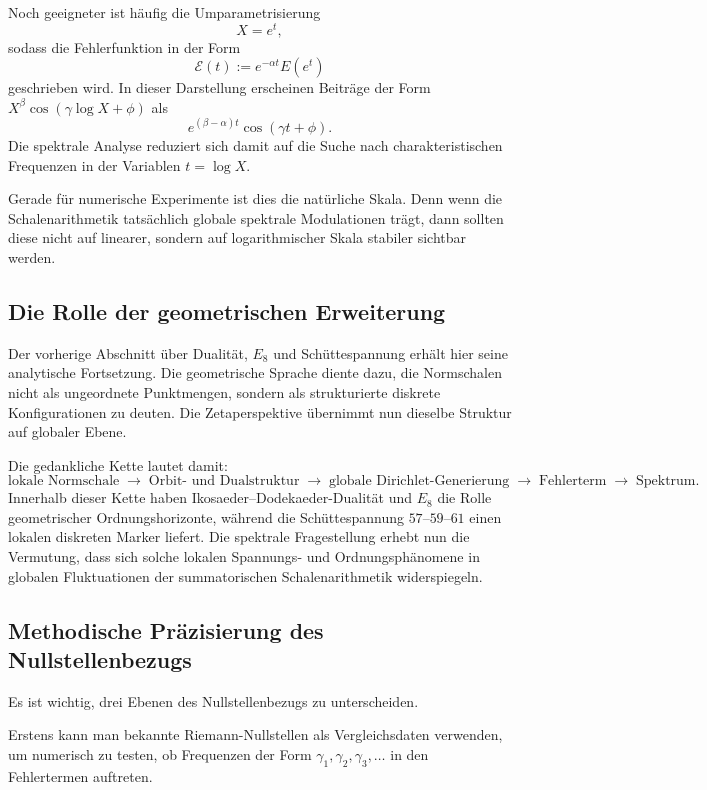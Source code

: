 \documentclass[a4paper,12pt]{article}
\theoremstyle{definition}
\numberwithin{equation}{section}
\begin{document}
	Noch geeigneter ist häufig die Umparametrisierung
	\[
	X = e^t,
	\]
	sodass die Fehlerfunktion in der Form
	\[
	\mathcal E(t) := e^{-\alpha t} E(e^t)
	\]
	geschrieben wird. In dieser Darstellung erscheinen Beiträge der Form $X^\beta \cos(\gamma\log X + \phi)$ als
	\[
	e^{(\beta-\alpha)t} \cos(\gamma t + \phi).
	\]
	Die spektrale Analyse reduziert sich damit auf die Suche nach charakteristischen Frequenzen in der Variablen $t=\log X$.
	
	Gerade für numerische Experimente ist dies die natürliche Skala. Denn wenn die Schalenarithmetik tatsächlich globale spektrale Modulationen trägt, dann sollten diese nicht auf linearer, sondern auf logarithmischer Skala stabiler sichtbar werden.
	
	\subsection{Die Rolle der geometrischen Erweiterung}
	
	Der vorherige Abschnitt über Dualität, $E_8$ und Schüttespannung erhält hier seine analytische Fortsetzung. Die geometrische Sprache diente dazu, die Normschalen nicht als ungeordnete Punktmengen, sondern als strukturierte diskrete Konfigurationen zu deuten. Die Zetaperspektive übernimmt nun dieselbe Struktur auf globaler Ebene.
	
	Die gedankliche Kette lautet damit:
	\[
	\text{lokale Normschale}
	\;\longrightarrow\;
	\text{Orbit- und Dualstruktur}
	\;\longrightarrow\;
	\text{globale Dirichlet-Generierung}
	\;\longrightarrow\;
	\text{Fehlerterm}
	\;\longrightarrow\;
	\text{Spektrum}.
	\]
	Innerhalb dieser Kette haben Ikosaeder--Dodekaeder-Dualität und $E_8$ die Rolle geometrischer Ordnungshorizonte, während die Schüttespannung $57$--$59$--$61$ einen lokalen diskreten Marker liefert. Die spektrale Fragestellung erhebt nun die Vermutung, dass sich solche lokalen Spannungs- und Ordnungsphänomene in globalen Fluktuationen der summatorischen Schalenarithmetik widerspiegeln.
	
	\subsection{Methodische Präzisierung des Nullstellenbezugs}
	
	Es ist wichtig, drei Ebenen des Nullstellenbezugs zu unterscheiden.
	
	Erstens kann man bekannte Riemann-Nullstellen als Vergleichsdaten verwenden, um numerisch zu testen, ob Frequenzen der Form $\gamma_1,\gamma_2,\gamma_3,\dots$ in den Fehlertermen auftreten.
	
\end{document}
